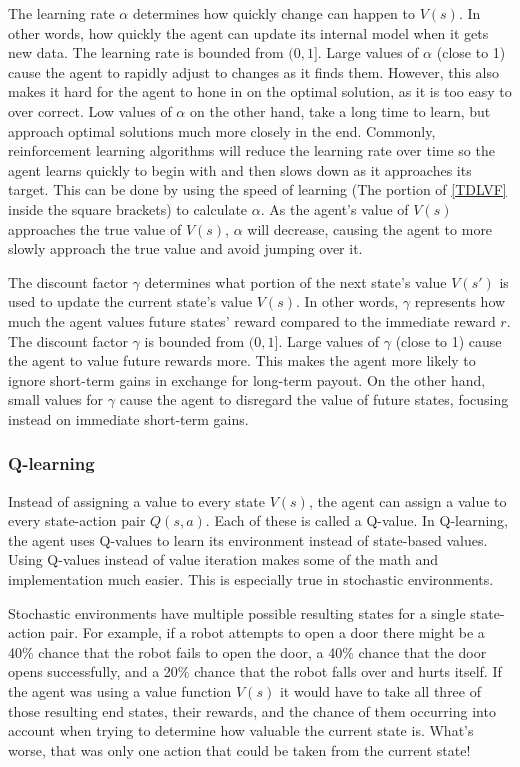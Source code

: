 \documentclass[12pt]{thesis}
\begin{document}
The learning rate $\alpha$ determines how quickly change can happen to $V(s)$. In other words, how quickly the agent can update its internal model when it gets new data. The learning rate is bounded from $(0,1]$. Large values of $\alpha$ (close to 1) cause the agent to rapidly adjust to changes as it finds them. However, this also makes it hard for the agent to hone in on the optimal solution, as it is too easy to over correct. Low values of $\alpha$ on the other hand, take a long time to learn, but approach optimal solutions much more closely in the end. Commonly, reinforcement learning algorithms will reduce the learning rate over time so the agent learns quickly to begin with and then slows down as it approaches its target. This can be done by using the speed of learning (The portion of \ref{TDLVF} inside the square brackets) to calculate $\alpha$. As the agent's value of $V(s)$ approaches the true value of $V(s)$, $\alpha$ will decrease, causing the agent to more slowly approach the true value and avoid jumping over it.

The discount factor $\gamma$ determines what portion of the next state's value $V(s')$ is used to update the current state's value $V(s)$. In other words, $\gamma$ represents how much the agent values future states' reward compared to the immediate reward $r$. The discount factor $\gamma$ is bounded from $(0,1]$. Large values of $\gamma$ (close to 1) cause the agent to value future rewards more. This makes the agent more likely to ignore short-term gains in exchange for long-term payout. On the other hand, small values for $\gamma$ cause the agent to disregard the value of future states, focusing instead on immediate short-term gains.
\subsubsection{Q-learning}
Instead of assigning a value to every state $V(s)$, the agent can assign a value to every state-action pair $Q(s,a)$. Each of these is called a Q-value. In Q-learning, the agent uses Q-values to learn its environment instead of state-based values. Using Q-values instead of value iteration makes some of the math and implementation much easier. This is especially true in stochastic environments.

Stochastic environments have multiple possible resulting states for a single state-action pair. For example, if a robot attempts to open a door there might be a 40\% chance that the robot fails to open the door, a 40\% chance that the door opens successfully, and a 20\% chance that the robot falls over and hurts itself. If the agent was using a value function $V(s)$ it would have to take all three of those resulting end states, their rewards, and the chance of them occurring into account when trying to determine how valuable the current state is. What's worse, that was only one action that could be taken from the current state!
\end{document}
